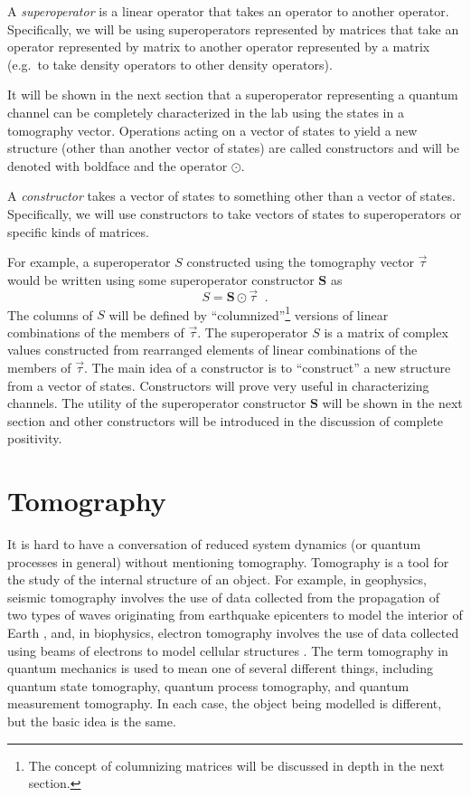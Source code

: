 \begin{definition}
A {\em superoperator} is a linear operator that takes an operator to another operator.  Specifically, we will be using superoperators represented by matrices that take an operator represented by matrix to another operator represented by a matrix (e.g.\ to take density operators to other density operators).
\end{definition}
It will be shown in the next section that a superoperator representing a quantum channel can be completely characterized in the lab using the states in a tomography vector.  Operations acting on a vector of states to yield a new structure (other than another vector of states) are called constructors and will be denoted with boldface and the operator $\odot$.  
\begin{definition}
A {\em constructor} takes a vector of states to something other than a vector of states.  Specifically, we will use constructors to take vectors of states to superoperators or specific kinds of matrices.
\end{definition}

For example, a superoperator $S$ constructed using the tomography vector $\vec{\tau}$ would be written using some superoperator constructor $\mathbf{S}$ as
$$
S = \mathbf{S}\odot \vec{\tau}\;\;.
$$
The columns of $S$ will be defined by ``columnized''\footnote{The concept of columnizing matrices will be discussed in depth in the next section.} versions of linear combinations of the members of $\vec{\tau}$.  The superoperator $S$ is a matrix of complex values constructed from rearranged elements of linear combinations of the members of $\vec{\tau}$.  The main idea of a constructor is to ``construct'' a new structure from a vector of states.  Constructors will prove very useful in characterizing channels.  The utility of the superoperator constructor $\mathbf{S}$ will be shown in the next section and other constructors will be introduced in the discussion of complete positivity.

\section{Tomography}
\label{sec:tomo}

It is hard to have a conversation of reduced system dynamics (or quantum processes in general) without mentioning tomography.  Tomography is a tool for the study of the internal structure of an object.  For example, in geophysics, seismic tomography involves the use of data collected from the propagation of two types of waves originating from earthquake epicenters to model the interior of Earth \cite{Lo1994}, and, in biophysics, electron tomography involves the use of data collected using beams of electrons to model cellular structures \cite{Frank2006}.  The term tomography in quantum mechanics is used to mean one of several different things, including quantum state tomography, quantum process tomography, and quantum measurement tomography.  In each case, the object being modelled is different, but the basic idea is the same.

